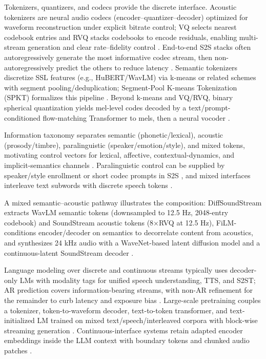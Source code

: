 Tokenizers, quantizers, and codecs provide the discrete interface. Acoustic tokenizers are neural audio codecs (encoder–quantizer–decoder) optimized for waveform reconstruction under explicit bitrate control; VQ selects nearest codebook entries and RVQ stacks codebooks to encode residuals, enabling multi-stream generation and clear rate–fidelity control \cite{guo2025recentadvancesdiscretespeechtokensreview}. End-to-end S2S stacks often autoregressively generate the most informative codec stream, then non-autoregressively predict the others to reduce latency \cite{peng2024mslms2stmultitaskspeechlanguagemodeltext}. Semantic tokenizers discretize SSL features (e.g., HuBERT/WavLM) via k-means or related schemes with segment pooling/deduplication; Segment-Pool K-means Tokenization (SPKT) formalizes this pipeline \cite{kando2025exploringeffectsegmentationvocabularysiz}. Beyond k-means and VQ/RVQ, binary spherical quantization yields mel-level codes decoded by a text/prompt-conditioned flow-matching Transformer to mels, then a neural vocoder \cite{wang2025tadicodectextawarediffusionspeechtokeniz}.

Information taxonomy separates semantic (phonetic/lexical), acoustic (prosody/timbre), paralinguistic (speaker/emotion/style), and mixed tokens, motivating control vectors for lexical, affective, contextual-dynamics, and implicit-semantics channels \cite{guo2025recentadvancesdiscretespeechtokensreview,wang2025bossbeyondsemanticspeech}. Paralinguistic control can be supplied by speaker/style enrollment or short codec prompts in S2S \cite{wu2024speechcomposerunifyingmultiplespeechtask,peng2024mslms2stmultitaskspeechlanguagemodeltext}, and mixed interfaces interleave text subwords with discrete speech tokens \cite{wu2024speechcomposerunifyingmultiplespeechtask}.

A mixed semantic–acoustic pathway illustrates the composition: DiffSoundStream extracts WavLM semantic tokens (downsampled to 12.5 Hz, 2048-entry codebook) and SoundStream acoustic tokens (8×RVQ at 12.5 Hz), FiLM-conditions encoder/decoder on semantics to decorrelate content from acoustics, and synthesizes 24 kHz audio with a WaveNet-based latent diffusion model and a continuous-latent SoundStream decoder \cite{yang2025diffsoundstreamefficientspeechtokenizati}.

Language modeling over discrete and continuous streams typically uses decoder-only LMs with modality tags for unified speech understanding, TTS, and S2ST; AR prediction covers information-bearing streams, with non-AR refinement for the remainder to curb latency and exposure bias \cite{wu2024speechcomposerunifyingmultiplespeechtask,peng2024mslms2stmultitaskspeechlanguagemodeltext}. Large-scale pretraining couples a tokenizer, token-to-waveform decoder, text-to-token transformer, and text-initialized LM trained on mixed text/speech/interleaved corpora with block-wise streaming generation \cite{zeng2024scalingspeechtextpretrainingsyntheticint}. Continuous-interface systems retain adapted encoder embeddings inside the LLM context with boundary tokens and chunked audio patches \cite{nguyen2025qwenvsgemmaintegrationwhispercomparative,shu2023llasmlargelanguagespeechmodel}.

